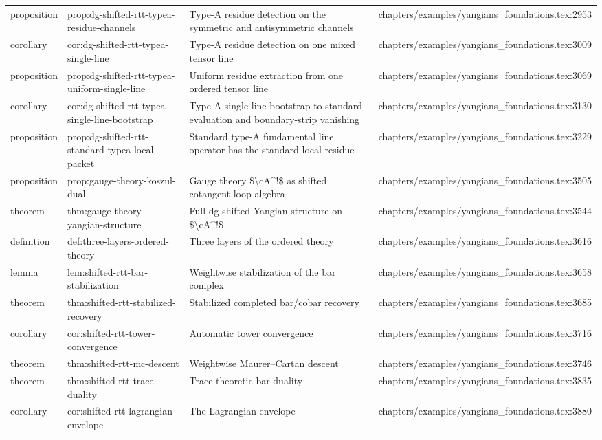 \documentclass[11pt]{article}
\begin{document}
\begin{longtable}{L{0.10\textwidth}L{0.26\textwidth}L{0.42\textwidth}L{0.22\textwidth}}
proposition & prop:dg-shifted-rtt-typea-residue-channels & Type-A residue detection on the symmetric and antisymmetric channels & chapters/examples/yangians\_foundations.tex:2953\\
corollary & cor:dg-shifted-rtt-typea-single-line & Type-A residue detection on one mixed tensor line & chapters/examples/yangians\_foundations.tex:3009\\
proposition & prop:dg-shifted-rtt-typea-uniform-single-line & Uniform residue extraction from one ordered tensor line & chapters/examples/yangians\_foundations.tex:3069\\
corollary & cor:dg-shifted-rtt-typea-single-line-bootstrap & Type-A single-line bootstrap to standard evaluation and boundary-strip vanishing & chapters/examples/yangians\_foundations.tex:3130\\
proposition & prop:dg-shifted-rtt-standard-typea-local-packet & Standard type-A fundamental line operator has the standard local residue & chapters/examples/yangians\_foundations.tex:3229\\
proposition & prop:gauge-theory-koszul-dual & Gauge theory \$\textbackslash{}cA\textasciicircum{}!\$ as shifted cotangent loop algebra & chapters/examples/yangians\_foundations.tex:3505\\
theorem & thm:gauge-theory-yangian-structure & Full dg-shifted Yangian structure on \$\textbackslash{}cA\textasciicircum{}!\$ & chapters/examples/yangians\_foundations.tex:3544\\
definition & def:three-layers-ordered-theory & Three layers of the ordered theory & chapters/examples/yangians\_foundations.tex:3616\\
lemma & lem:shifted-rtt-bar-stabilization & Weightwise stabilization of the bar complex & chapters/examples/yangians\_foundations.tex:3658\\
theorem & thm:shifted-rtt-stabilized-recovery & Stabilized completed bar/cobar recovery & chapters/examples/yangians\_foundations.tex:3685\\
corollary & cor:shifted-rtt-tower-convergence & Automatic tower convergence & chapters/examples/yangians\_foundations.tex:3716\\
theorem & thm:shifted-rtt-mc-descent & Weightwise Maurer--Cartan descent & chapters/examples/yangians\_foundations.tex:3746\\
theorem & thm:shifted-rtt-trace-duality & Trace-theoretic bar duality & chapters/examples/yangians\_foundations.tex:3835\\
corollary & cor:shifted-rtt-lagrangian-envelope & The Lagrangian envelope & chapters/examples/yangians\_foundations.tex:3880\\

\end{longtable}
\end{document}
